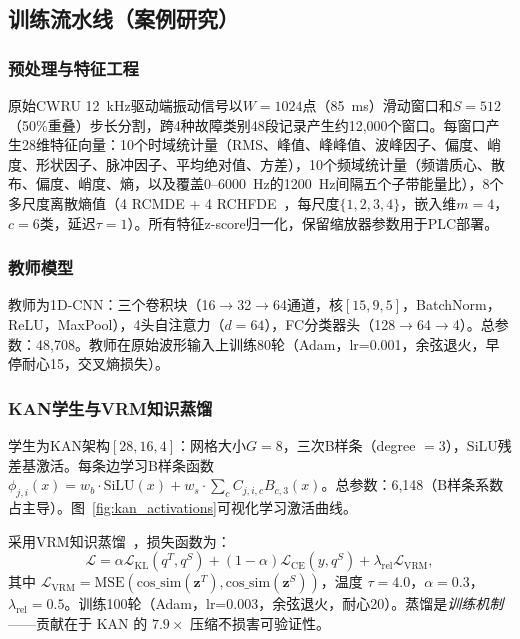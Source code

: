 \documentclass[journal,onecolumn]{IEEEtran}
\theoremstyle{definition}
\theoremstyle{plain}
\theoremstyle{remark}
\begin{document}
\subsection{训练流水线（案例研究）}

\subsubsection{预处理与特征工程}

原始CWRU 12~kHz驱动端振动信号以$W=1024$点（85~ms）滑动窗口和$S=512$（50\%重叠）步长分割，跨4种故障类别48段记录产生约12,000个窗口。每窗口产生28维特征向量：10个时域统计量（RMS、峰值、峰峰值、波峰因子、偏度、峭度、形状因子、脉冲因子、平均绝对值、方差），10个频域统计量（频谱质心、散布、偏度、峭度、熵，以及覆盖0--6000~Hz的1200~Hz间隔五个子带能量比），8个多尺度离散熵值（4 RCMDE + 4 RCHFDE~\cite{azami2017rcmde,chen2024hrcgmfde}，每尺度$\{1,2,3,4\}$，嵌入维$m=4$，$c=6$类，延迟$\tau=1$）。所有特征z-score归一化，保留缩放器参数用于PLC部署。

\subsubsection{教师模型}

教师为1D-CNN：三个卷积块（16$\rightarrow$32$\rightarrow$64通道，核$[15,9,5]$，BatchNorm，ReLU，MaxPool），4头自注意力（$d=64$），FC分类器头（128$\rightarrow$64$\rightarrow$4）。总参数：48,708。教师在原始波形输入上训练80轮（Adam，lr=0.001，余弦退火，早停耐心15，交叉熵损失）。

\subsubsection{KAN学生与VRM知识蒸馏}

学生为KAN架构$[28,16,4]$：网格大小$G=8$，三次B样条（degree $=3$），SiLU残差基激活。每条边学习B样条函数$\phi_{j,i}(x) = w_b \cdot \text{SiLU}(x) + w_s \cdot \sum_{c} C_{j,i,c} B_{c,3}(x)$。总参数：6,148（B样条系数占主导）。图~\ref{fig:kan_activations}可视化学习激活曲线。

采用VRM知识蒸馏~\cite{zhang2025vrm}，损失函数为：
\begin{equation}
\mathcal{L} = \alpha \mathcal{L}_{\text{KL}}(q^T, q^S) + (1-\alpha)\mathcal{L}_{\text{CE}}(y, q^S) + \lambda_{\text{rel}}\mathcal{L}_{\text{VRM}},
\end{equation}
其中 $\mathcal{L}_{\text{VRM}} = \text{MSE}(\text{cos\_sim}(\mathbf{z}^T), \text{cos\_sim}(\mathbf{z}^S))$，温度 $\tau=4.0$，$\alpha=0.3$，$\lambda_{\text{rel}}=0.5$。训练100轮（Adam，lr=0.003，余弦退火，耐心20）。蒸馏是\textit{训练机制}——贡献在于 KAN 的 $7.9\times$ 压缩不损害可验证性。
\end{document}
